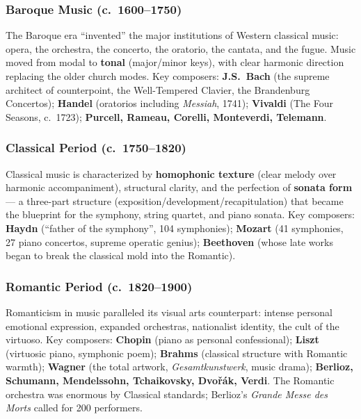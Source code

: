 \documentclass[11pt,letterpaper]{article}
\begin{document}
\subsubsection{Baroque Music (c.~1600--1750)}

The Baroque era ``invented'' the major institutions of Western classical music: opera, the orchestra, the concerto, the oratorio, the cantata, and the fugue. Music moved from modal to \textbf{tonal} (major/minor keys), with clear harmonic direction replacing the older church modes. Key composers: \textbf{J.S.\ Bach} (the supreme architect of counterpoint, the Well-Tempered Clavier, the Brandenburg Concertos); \textbf{Handel} (oratorios including \emph{Messiah}, 1741); \textbf{Vivaldi} (The Four Seasons, c.~1723); \textbf{Purcell, Rameau, Corelli, Monteverdi, Telemann}.

\subsubsection{Classical Period (c.~1750--1820)}

Classical music is characterized by \textbf{homophonic texture} (clear melody over harmonic accompaniment), structural clarity, and the perfection of \textbf{sonata form} --- a three-part structure (exposition/development/recapitulation) that became the blueprint for the symphony, string quartet, and piano sonata. Key composers: \textbf{Haydn} (``father of the symphony'', 104 symphonies); \textbf{Mozart} (41 symphonies, 27 piano concertos, supreme operatic genius); \textbf{Beethoven} (whose late works began to break the classical mold into the Romantic).

\subsubsection{Romantic Period (c.~1820--1900)}

Romanticism in music paralleled its visual arts counterpart: intense personal emotional expression, expanded orchestras, nationalist identity, the cult of the virtuoso. Key composers: \textbf{Chopin} (piano as personal confessional); \textbf{Liszt} (virtuosic piano, symphonic poem); \textbf{Brahms} (classical structure with Romantic warmth); \textbf{Wagner} (the total artwork, \emph{Gesamtkunstwerk}, music drama); \textbf{Berlioz, Schumann, Mendelssohn, Tchaikovsky, Dvořák, Verdi}. The Romantic orchestra was enormous by Classical standards; Berlioz's \emph{Grande Messe des Morts} called for 200 performers.
\end{document}
